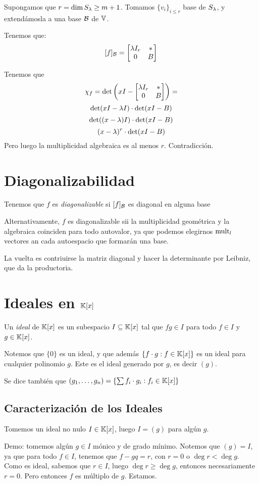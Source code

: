 \documentclass{article}
\begin{document}
Supongamos que $r = \dim S_\lambda \geq m+1$. Tomamos $\{v_i\}_{i \leq r}$ base de $S_\lambda$, y extendámosla a una base $\mathcal{B}$ de $\mathbb{V}$.

Tenemos que:
\[
	[f]_{\mathcal{B}} = 
	\begin{bmatrix}
		\lambda I_r & * \\
		0 & B
	\end{bmatrix}
\]

Tenemos que \[\chi_f =
\det \left(
	xI - \begin{bmatrix}
		\lambda I_r & * \\
		0 & B
\end{bmatrix} \right) = \]
\[
\det (xI - \lambda I) \cdot \det(xI - B)
\]
\[
	\det ((x - \lambda) I) \cdot \det(xI - B)
\]
\[
	(x - \lambda)^r \cdot \det(xI - B)
\]
Pero luego la multiplicidad algebraica es al menos $r$. Contradicción.

\section*{Diagonalizabilidad}
Tenemos que $f$ es \emph{diagonalizable} si $[f]_{\mathcal{B}}$ es diagonal en alguna base

Alternativamente, $f$ es diagonalizable sii la multiplicidad geométrica y la algebraica coinciden para todo autovalor, ya que podemos elegirnos $\operatorname{mult}_l$ vectores an cada autoespacio que formarán una base.

La vuelta es contriuirse la matriz diagonal y hacer la determinante por Leibniz, que da la productoria.

\section*{Ideales en $\mathbb{K}[x]$}
Un \emph{ideal} de $\mathbb{K}[x]$ es un subespacio $I \subseteq \mathbb{K}[x]$ tal que $fg \in I$ para todo $f \in I$ y $g \in \mathbb{K}[x]$.

Notemos que $\{0\}$ es un ideal, y que además $\{f \cdot g : f \in \mathbb{K}[x]\}$ es un ideal para cualquier polinomio $g$. Este es el ideal generado por $g$, es decir $(g)$.

Se dice también que $(g_1, \dots, g_n) = \left\{\sum f_i \cdot g_i : f_i \in \mathbb{K}[x]\right\}$

\subsection*{Caracterización de los Ideales}
Tomemos un ideal no nulo $I \in \mathbb{K}[x]$, luego $I = (g)$ para algún $g$.

Demo: tomemos algún $g \in I$ mónico y de grado mínimo. Notemos que $(g) = I$, ya que para todo $f \in I$, tenemos que $f - gq = r$, con $r = 0$ o $\deg r < \deg g$. Como es ideal, sabemos que $r \in I$, luego $\deg r \geq \deg g$, entonces necesariamente $r = 0$. Pero entonces $f$ es múltiplo de $g$. Estamos.
\end{document}
